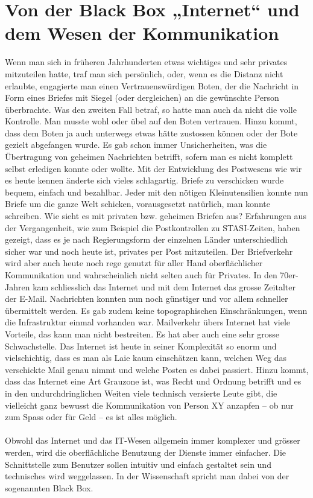 \section{Von der Black Box „Internet“ und dem Wesen der Kommunikation}
Wenn man sich in früheren Jahrhunderten etwas wichtiges und sehr privates mitzuteilen hatte, traf man sich persönlich, oder, wenn es die Distanz nicht erlaubte, engagierte man einen Vertrauenswürdigen Boten, der die Nachricht in Form eines Briefes mit Siegel (oder dergleichen) an die gewünschte Person überbrachte. Was den zweiten Fall betraf, so hatte man auch da nicht die volle Kontrolle. Man musste wohl oder übel auf den Boten vertrauen. Hinzu kommt, dass dem Boten ja auch unterwegs etwas hätte zustossen können oder der Bote gezielt abgefangen wurde. Es gab schon immer Unsicherheiten, was die Übertragung von geheimen Nachrichten betrifft, sofern man es nicht komplett selbst erledigen konnte oder wollte. Mit der Entwicklung des Postwesens wie wir es heute kennen änderte sich vieles schlagartig. Briefe zu verschicken wurde bequem, einfach und bezahlbar. Jeder mit den nötigen Kleinutensilien konnte nun Briefe um die ganze Welt schicken, vorausgesetzt natürlich, man konnte schreiben. Wie sieht es mit privaten bzw. geheimen Briefen aus? Erfahrungen aus der Vergangenheit, wie zum Beispiel die Postkontrollen zu STASI-Zeiten, haben gezeigt, dass es je nach Regierungsform der einzelnen Länder unterschiedlich sicher war und noch heute ist, privates per Post mitzuteilen. Der Briefverkehr wird aber auch heute noch rege genutzt für aller Hand oberflächlicher Kommunikation und wahrscheinlich nicht selten auch für Privates. In den 70er-Jahren kam schliesslich das Internet und mit dem Internet das grosse Zeitalter der E-Mail. Nachrichten konnten nun noch günstiger und vor allem schneller übermittelt werden. Es gab zudem keine topographischen Einschränkungen, wenn die Infrastruktur einmal vorhanden war. Mailverkehr übers Internet hat viele Vorteile, das kann man nicht bestreiten. Es hat aber auch eine sehr grosse Schwachstelle. Das Internet ist heute in seiner Komplexität so enorm und vielschichtig, dass es man als Laie kaum einschätzen kann, welchen Weg das verschickte Mail genau nimmt und welche Posten es dabei passiert. Hinzu kommt, dass das Internet eine Art Grauzone ist, was Recht und Ordnung betrifft und es in den undurchdringlichen Weiten viele technisch versierte Leute gibt, die vielleicht ganz bewusst die Kommunikation von Person XY anzapfen – ob nur zum Spass oder für Geld – es ist alles möglich.
\\
\\
Obwohl das Internet und das IT-Wesen allgemein immer komplexer und grösser werden, wird die oberflächliche Benutzung der Dienste immer einfacher. Die Schnittstelle zum Benutzer sollen intuitiv und einfach gestaltet sein und technisches wird weggelassen. In der Wissenschaft spricht man dabei von der sogenannten Black Box.
